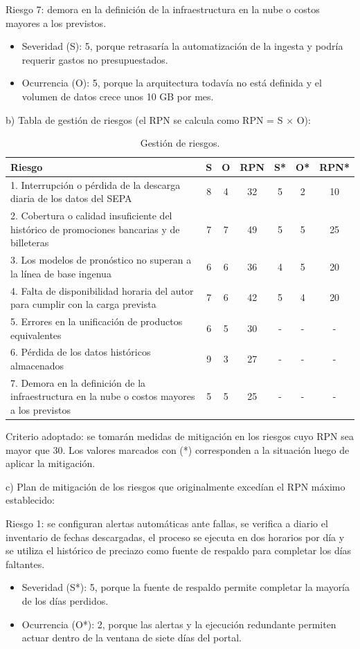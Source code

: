 \documentclass[
11pt, %
]{charter}
\begin{document}
Riesgo 7: demora en la definición de la infraestructura en la nube o costos mayores a los previstos.
\begin{itemize}
	\item Severidad (S): 5, porque retrasaría la automatización de la ingesta y podría requerir gastos no presupuestados.
	\item Ocurrencia (O): 5, porque la arquitectura todavía no está definida y el volumen de datos crece unos 10 GB por mes.
\end{itemize}

b) Tabla de gestión de riesgos (el RPN se calcula como RPN = S $\times$ O):

\begin{table}[H]
\centering
\caption{Gestión de riesgos.}
\label{tab:riesgos}
\begin{tabularx}{\linewidth}{@{}|X|c|c|c|c|c|c|@{}}
\hline
\rowcolor[HTML]{C0C0C0}
Riesgo & S & O & RPN & S* & O* & RPN* \\ \hline
1. Interrupción o pérdida de la descarga diaria de los datos del SEPA & 8 & 4 & 32 & 5 & 2 & 10 \\ \hline
2. Cobertura o calidad insuficiente del histórico de promociones bancarias y de billeteras & 7 & 7 & 49 & 5 & 5 & 25 \\ \hline
3. Los modelos de pronóstico no superan a la línea de base ingenua & 6 & 6 & 36 & 4 & 5 & 20 \\ \hline
4. Falta de disponibilidad horaria del autor para cumplir con la carga prevista & 7 & 6 & 42 & 5 & 4 & 20 \\ \hline
5. Errores en la unificación de productos equivalentes & 6 & 5 & 30 & - & - & - \\ \hline
6. Pérdida de los datos históricos almacenados & 9 & 3 & 27 & - & - & - \\ \hline
7. Demora en la definición de la infraestructura en la nube o costos mayores a los previstos & 5 & 5 & 25 & - & - & - \\ \hline
\end{tabularx}
\end{table}

Criterio adoptado: se tomarán medidas de mitigación en los riesgos cuyo RPN sea mayor que 30. Los valores marcados con (*) corresponden a la situación luego de aplicar la mitigación.

c) Plan de mitigación de los riesgos que originalmente excedían el RPN máximo establecido:

Riesgo 1: se configuran alertas automáticas ante fallas, se verifica a diario el inventario de fechas descargadas, el proceso se ejecuta en dos horarios por día y se utiliza el histórico de preciazo como fuente de respaldo para completar los días faltantes.
\begin{itemize}
	\item Severidad (S*): 5, porque la fuente de respaldo permite completar la mayoría de los días perdidos.
	\item Ocurrencia (O*): 2, porque las alertas y la ejecución redundante permiten actuar dentro de la ventana de siete días del portal.
\end{itemize}
\end{document}
